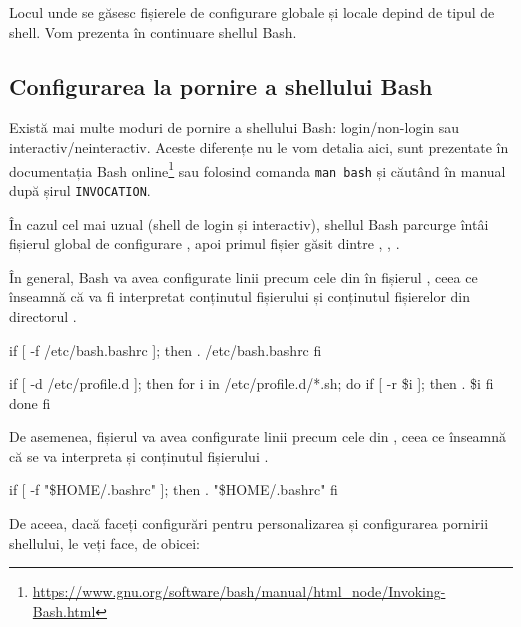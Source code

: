 Locul unde se găsesc fișierele de configurare globale și locale depind de tipul de shell.
Vom prezenta în continuare shellul Bash.

\subsection{Configurarea la pornire a shellului Bash}
\label{sec:cli:shell-start:config}

Există mai multe moduri de pornire a shellului Bash: login/non-login sau interactiv/neinteractiv.
Aceste diferențe nu le vom detalia aici, sunt prezentate în documentația Bash online\footnote{\url{https://www.gnu.org/software/bash/manual/html\_node/Invoking-Bash.html}} sau folosind comanda \texttt{man bash} și căutând în manual după șirul \texttt{INVOCATION}.

În cazul cel mai uzual (shell de login și interactiv), shellul Bash parcurge întâi fișierul global de configurare , apoi primul fișier găsit dintre , , .

În general, Bash va avea configurate linii precum cele din  în fișierul , ceea ce înseamnă că va fi interpretat conținutul fișierului  și conținutul fișierelor din directorul .

\begin{screen}[caption={Secvență de configurare Bash (/etc/profile)},label={lst:cli:etc-profile}]
        if [ -f /etc/bash.bashrc ]; then
            . /etc/bash.bashrc
        fi


if [ -d /etc/profile.d ]; then
    for i in /etc/profile.d/*.sh; do
        if [ -r \$i ]; then
            . \$i
        fi
    done
fi
\end{screen}

De asemenea, fișierul  va avea configurate linii precum cele din , ceea ce înseamnă că se va interpreta și conținutul fișierului .

\begin{screen}[caption={Secvență de configurare Bash (~/.bashrc)},label={lst:cli:home-profile}]
    if [ -f "\$HOME/.bashrc" ]; then
        . "\$HOME/.bashrc"
    fi
\end{screen}

De aceea, dacă faceți configurări pentru personalizarea și configurarea pornirii shellului, le veți face, de obicei:

